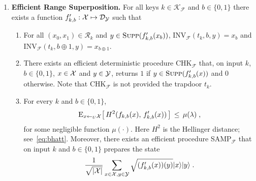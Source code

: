 {\begin{definition}
\begin{enumerate}
\item{\textbf{Efficient Range Superposition.}}
For all keys $k\in \mathcal{K}_{\mathcal{F}}$ and $b\in \{0,1\}$ there exists a function $f'_{k,b}:\mathcal{X}\mapsto \mathcal{D}_{\mathcal{Y}}$ such that
\begin{enumerate} 
\item For all $(x_0,x_1)\in \mathcal{R}_k$ and $y\in \textsc{Supp}(f'_{k,b}(x_b))$, INV$_{\mathcal{F}}(t_k,b,y) = x_b$ and INV$_{\mathcal{F}}(t_k,b\oplus 1,y) = x_{b\oplus 1}$. 
\item There exists an efficient deterministic procedure CHK$_{\mathcal{F}}$ that, on input $k$, $b\in \{0,1\}$, $x\in \mathcal{X}$ and $y\in \mathcal{Y}$, returns $1$ if  $y\in \textsc{Supp}(f'_{k,b}(x))$ and $0$ otherwise. Note that CHK$_{\mathcal{F}}$ is not provided the trapdoor $t_k$. 
\item For every $k$ and $b\in\{0,1\}$, 
$$ \textsc{E}_{x\leftarrow_U \mathcal{X}} \big[\,H^2(f_{k,b}(x),\,f'_{k,b}(x))\,\big] \,\leq\, \mu(\lambda)\;,$$
 for some negligible function $\mu(\cdot)$. Here $H^2$ is the Hellinger distance; see~\eqref{eq:bhatt}. Moreover, there exists an efficient procedure  SAMP$_{\mathcal{F}}$ that on input $k$ and $b\in\{0,1\}$ prepares the state
\begin{equation}
    \frac{1}{\sqrt{|\mathcal{X}|}}\sum_{x\in \mathcal{X},y\in \mathcal{Y}}\sqrt{(f'_{k,b}(x))(y)}|x\rangle|y\rangle\;.
\end{equation}


\end{enumerate}



\end{enumerate}
\end{definition}}
